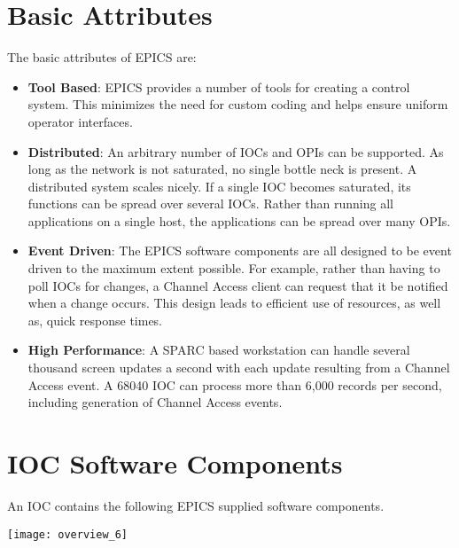 \section{Basic Attributes}

The basic attributes of EPICS are:

\begin{itemize}

\item \textbf{Tool Based}: EPICS provides a number of tools for creating a control system. This minimizes the need for custom 
coding and helps ensure uniform operator interfaces.

\item \textbf{Distributed}: An arbitrary number of IOCs and OPIs can be supported. As long as the network is not saturated, no 
single bottle neck is present. A distributed system scales nicely. If a single IOC becomes saturated, its functions can 
be spread over several IOCs. Rather than running all applications on a single host, the applications can be spread 
over many OPIs.

\item \textbf{Event Driven}: The EPICS software components are all designed to be event driven to the maximum extent 
possible. For example, rather than having to poll IOCs for changes, a Channel Access client can request that it be 
notified when a change occurs. This design leads to efficient use of resources, as well as, quick response times.

\item \textbf{High Performance}: A SPARC based workstation can handle several thousand screen updates a second with each 
update resulting from a Channel Access event. A 68040 IOC can process more than 6,000 records per second, 
including generation of Channel Access events. 

\end{itemize}

\section{IOC Software Components}


An IOC contains the following EPICS supplied software components.

\begin{center}
\texttt{[image: overview\_6]}
\end{center}

